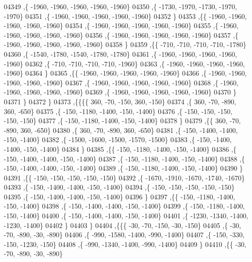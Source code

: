 \begin{DoxyCode}
04349     ,\{ -1960, -1960, -1960, -1960, -1960\}
04350     ,\{ -1730, -1970, -1730, -1970, -1970\}
04351     ,\{ -1960, -1960, -1960, -1960, -1960\}
04352     \}
04353    ,\{\{ -1960, -1960, -1960, -1960, -1960\}
04354     ,\{ -1960, -1960, -1960, -1960, -1960\}
04355     ,\{ -1960, -1960, -1960, -1960, -1960\}
04356     ,\{ -1960, -1960, -1960, -1960, -1960\}
04357     ,\{ -1960, -1960, -1960, -1960, -1960\}
04358     \}
04359    ,\{\{  -710,  -710,  -710,  -710, -1780\}
04360     ,\{ -1540, -1780, -1540, -1780, -1780\}
04361     ,\{ -1960, -1960, -1960, -1960, -1960\}
04362     ,\{  -710,  -710,  -710,  -710, -1960\}
04363     ,\{ -1960, -1960, -1960, -1960, -1960\}
04364     \}
04365    ,\{\{ -1960, -1960, -1960, -1960, -1960\}
04366     ,\{ -1960, -1960, -1960, -1960, -1960\}
04367     ,\{ -1960, -1960, -1960, -1960, -1960\}
04368     ,\{ -1960, -1960, -1960, -1960, -1960\}
04369     ,\{ -1960, -1960, -1960, -1960, -1960\}
04370     \}
04371    \}
04372   \}
04373  ,\{\{\{\{   360,   -70,  -150,   360,  -150\}
04374     ,\{   360,   -70,  -890,   360,  -650\}
04375     ,\{  -150, -1180, -1400,  -150, -1400\}
04376     ,\{  -150,  -150,  -150,  -150,  -150\}
04377     ,\{  -150, -1180, -1400,  -150, -1400\}
04378     \}
04379    ,\{\{   360,   -70,  -890,   360,  -650\}
04380     ,\{   360,   -70,  -890,   360,  -650\}
04381     ,\{  -150, -1400, -1400,  -150, -1400\}
04382     ,\{ -1500, -1600, -1500, -1570, -1500\}
04383     ,\{  -150, -1400, -1400,  -150, -1400\}
04384     \}
04385    ,\{\{  -150, -1180, -1400,  -150, -1400\}
04386     ,\{  -150, -1400, -1400,  -150, -1400\}
04387     ,\{  -150, -1180, -1400,  -150, -1400\}
04388     ,\{  -150, -1400, -1400,  -150, -1400\}
04389     ,\{  -150, -1180, -1400,  -150, -1400\}
04390     \}
04391    ,\{\{  -150,  -150,  -150,  -150,  -150\}
04392     ,\{ -1670, -1910, -1670, -1740, -1670\}
04393     ,\{  -150, -1400, -1400,  -150, -1400\}
04394     ,\{  -150,  -150,  -150,  -150,  -150\}
04395     ,\{  -150, -1400, -1400,  -150, -1400\}
04396     \}
04397    ,\{\{  -150, -1180, -1400,  -150, -1400\}
04398     ,\{  -150, -1400, -1400,  -150, -1400\}
04399     ,\{  -150, -1180, -1400,  -150, -1400\}
04400     ,\{  -150, -1400, -1400,  -150, -1400\}
04401     ,\{ -1230, -1340, -1400, -1230, -1400\}
04402     \}
04403    \}
04404   ,\{\{\{   -30,   -70,  -150,   -30,  -150\}
04405     ,\{   -30,   -70,  -890,   -30,  -890\}
04406     ,\{  -990, -1580, -1400,  -990, -1400\}
04407     ,\{  -150,  -330,  -150, -1230,  -150\}
04408     ,\{  -990, -1340, -1400,  -990, -1400\}
04409     \}
04410    ,\{\{   -30,   -70,  -890,   -30,  -890\}

\end{DoxyCode}
